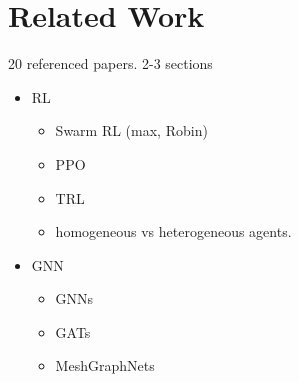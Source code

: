 
\chapter{Related Work}

20 referenced papers. 2-3 sections
\begin{itemize}[noitemsep,nolistsep]
	\item RL
	\begin{itemize}[noitemsep,nolistsep]
        \item Swarm RL (max, Robin)
        \item PPO
        \item TRL
        \item homogeneous vs heterogeneous agents.
    \end{itemize}
    
	\item GNN
	\begin{itemize}[noitemsep,nolistsep]
        \item GNNs
        \item GATs
        \item MeshGraphNets
    \end{itemize}
\end{itemize}
